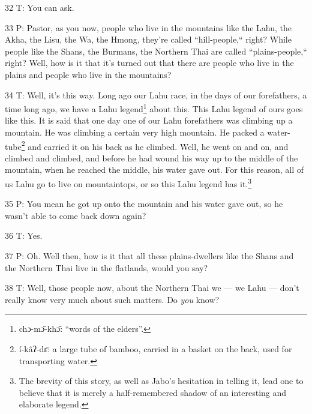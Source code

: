 32 T: You can ask.

33 P: Pastor, as you now, people who live in the mountains like the Lahu, the Akha,
the Lisu, the Wa, the Hmong, they're called ``hill-people,`` right?
While people like the Shans, the Burmans, the Northern Thai are called ``plains-people,``
right? Well, how is it that it's turned out that there are people who live in the
plains and people who live in the mountains?

34 T: Well, it's this way. Long ago our Lahu race, in the days of our forefathers,
a time long ago, we have a Lahu legend\footnote{chɔ-mɔ̂-khɔ̂: ``words of the elders''.} about this. This Lahu legend of ours
goes like this. It is said that one day one of our Lahu forefathers was climbing
up a mountain. He was climbing a certain very high mountain. He packed a water-tube\footnote{í-kâʔ-dɛ̄: a large tube of bamboo, carried in a basket on the back, used for transporting water.}
and carried it on his back as he climbed. Well, he went on and on, and climbed
and climbed, and before he had wound his way up to the middle of the mountain,
when he reached the middle, his water gave out. For this reason, all of us Lahu
go to live on mountaintops, or so this Lahu legend has it.\footnote{The brevity of this story, as well as Jabo's hesitation in telling it, lead one to believe that it is merely a half-remembered shadow of an interesting and elaborate legend.}

35 P: You mean he got up onto the mountain and his water gave out, so he wasn't
able to come back down again?

36 T: Yes.

37 P: Oh. Well then, how is it that all these plains-dwellers like the Shans and
the Northern Thai live in the flatlands, would you say?

38 T: Well, those people now, about the Northern Thai we --- we Lahu --- don't
really know very much about such matters. Do \textit{you} know?

